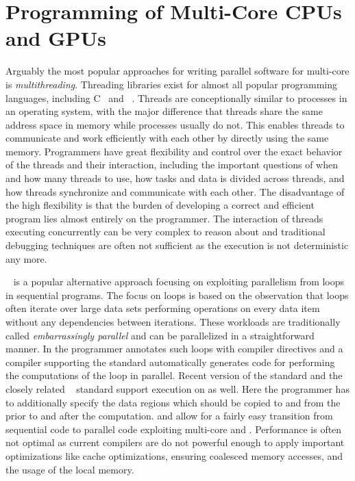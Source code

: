 \section{Programming of Multi-Core CPUs and GPUs}
Arguably the most popular approaches for writing parallel software for multi-core \CPUs is \emph{multithreading}.
Threading libraries exist for almost all popular programming languages, including C~\cite{Cstandard,Pthreads} and \Cpp~\cite{Cppstandard}.
Threads are conceptionally similar to processes in an operating system, with the major difference that threads share the same address space in memory while processes usually do not.
This enables threads to communicate and work efficiently with each other by directly using the same memory.
Programmers have great flexibility and control over the exact behavior of the threads and their interaction, including the important questions of when and how many threads to use, how tasks and data is divided across threads, and how threads synchronize and communicate with each other.
The disadvantage of the high flexibility is that the burden of developing a correct and efficient program lies almost entirely on the programmer.
The interaction of threads executing concurrently can be very complex to reason about and traditional debugging techniques are often not sufficient as the execution is not deterministic any more.

\OpenMP~\cite{OpenMP} is a popular alternative approach focusing on exploiting parallelism from loops in sequential programs.
The focus on loops is based on the observation that loops often iterate over large data sets performing operations on every data item without any dependencies between iterations.
These workloads are traditionally called \emph{embarrassingly parallel} and can be parallelized in a straightforward manner.
In \OpenMP the programmer annotates such loops with compiler directives and a compiler supporting the \OpenMP standard automatically generates code for performing the computations of the loop in parallel.
Recent version of the \OpenMP standard and the closely related \OpenACC~\cite{OpenACC} standard support execution on \GPUs as well.
Here the programmer has to additionally specify the data regions which should be copied to and from the \GPU prior to and after the computation.
\OpenMP and \OpenACC allow for a fairly easy transition from sequential code to parallel code exploiting multi-core \CPUs and \GPUs.
Performance is often not optimal as  current compilers are do not powerful enough to apply important optimizations like cache optimizations, ensuring coalesced memory accesses, and the usage of the local memory.

